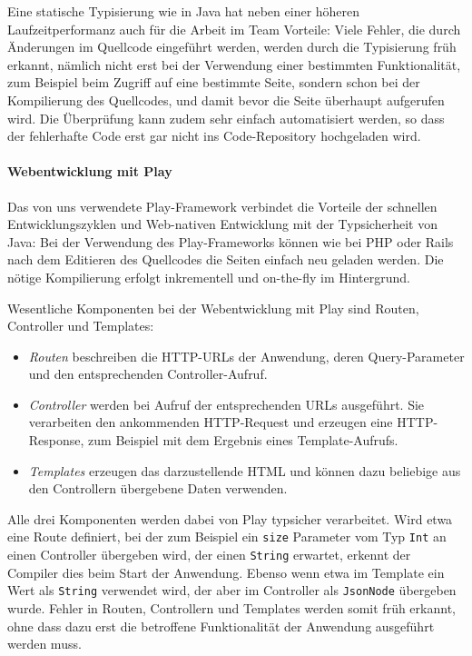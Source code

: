 \documentclass[a4paper,
fontsize=11pt,
oneside,
numbers=noperiodatend,
parskip=half-,
bibliography=totoc,
final
]{scrartcl}
\providecommand{\tightlist}{%
  \setlength{\itemsep}{0pt}\setlength{\parskip}{0pt}}
\begin{document}
Eine statische Typisierung wie in Java hat neben einer höheren
Laufzeitperformanz auch für die Arbeit im Team Vorteile: Viele Fehler,
die durch Änderungen im Quellcode eingeführt werden, werden durch die
Typisierung früh erkannt, nämlich nicht erst bei der Verwendung einer
bestimmten Funktionalität, zum Beispiel beim Zugriff auf eine bestimmte
Seite, sondern schon bei der Kompilierung des Quellcodes, und damit
bevor die Seite überhaupt aufgerufen wird. Die Überprüfung kann zudem
sehr einfach automatisiert werden, so dass der fehlerhafte Code erst gar
nicht ins Code-Repository hochgeladen wird.

\paragraph{Webentwicklung mit Play}\label{webentwicklung-mit-play}

Das von uns verwendete Play-Framework verbindet die Vorteile der
schnellen Entwicklungszyklen und Web-nativen Entwicklung mit der
Typsicherheit von Java: Bei der Verwendung des Play-Frameworks können
wie bei PHP oder Rails nach dem Editieren des Quellcodes die Seiten
einfach neu geladen werden. Die nötige Kompilierung erfolgt inkrementell
und on-the-fly im Hintergrund.

Wesentliche Komponenten bei der Webentwicklung mit Play sind Routen,
Controller und Templates:

\begin{itemize}
\tightlist
\item
  \emph{Routen} beschreiben die HTTP-URLs der Anwendung, deren
  Query-Parameter und den entsprechenden Controller-Aufruf.
\item
  \emph{Controller} werden bei Aufruf der entsprechenden URLs
  ausgeführt. Sie verarbeiten den ankommenden HTTP-Request und erzeugen
  eine HTTP-Response, zum Beispiel mit dem Ergebnis eines
  Template-Aufrufs.
\item
  \emph{Templates} erzeugen das darzustellende HTML und können dazu
  beliebige aus den Controllern übergebene Daten verwenden.
\end{itemize}

Alle drei Komponenten werden dabei von Play typsicher verarbeitet. Wird
etwa eine Route definiert, bei der zum Beispiel ein \texttt{size}
Parameter vom Typ \texttt{Int} an einen Controller übergeben wird, der
einen \texttt{String} erwartet, erkennt der Compiler dies beim Start der
Anwendung. Ebenso wenn etwa im Template ein Wert als \texttt{String}
verwendet wird, der aber im Controller als \texttt{JsonNode} übergeben
wurde. Fehler in Routen, Controllern und Templates werden somit früh
erkannt, ohne dass dazu erst die betroffene Funktionalität der Anwendung
ausgeführt werden muss.
\end{document}
